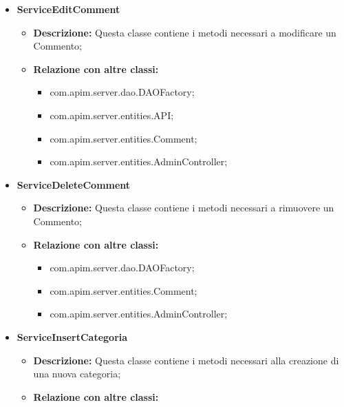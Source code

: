 {{{\begin{itemize}
\begin{itemize}
\begin{itemize}
              \item com.apim.server.dao.DAOFactory;
              \item com.apim.server.entities.API;
              \item com.apim.server.entities.AdminController;
            \end{itemize}
          \end{itemize}
          \item \textbf{ServiceEditComment}
          \begin{itemize}
            \item \textbf{Descrizione:} Questa classe contiene i metodi necessari a modificare un Commento;
            \item \textbf{Relazione con altre classi:}
            \begin{itemize}
              \item com.apim.server.dao.DAOFactory;
              \item com.apim.server.entities.API;
              \item com.apim.server.entities.Comment;
              \item com.apim.server.entities.AdminController;
            \end{itemize}
          \end{itemize}
          \item \textbf{ServiceDeleteComment}
          \begin{itemize}
            \item \textbf{Descrizione:} Questa classe contiene i metodi necessari a rimuovere un Commento;
            \item \textbf{Relazione con altre classi:}
            \begin{itemize}
              \item com.apim.server.dao.DAOFactory;
              \item com.apim.server.entities.Comment;
              \item com.apim.server.entities.AdminController;
            \end{itemize}
          \end{itemize}
          \item \textbf{ServiceInsertCategoria}
          \begin{itemize}
            \item \textbf{Descrizione:} Questa classe contiene i metodi necessari alla creazione di una nuova categoria;
            \item \textbf{Relazione con altre classi:}

\end{itemize}
\end{itemize}}}}

